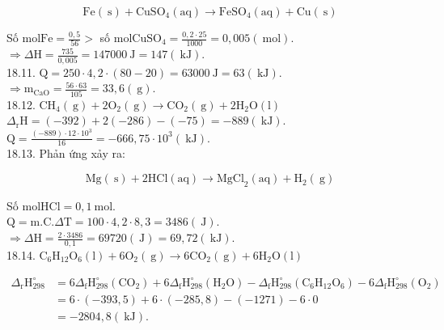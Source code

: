\documentclass[10pt]{article}
\begin{document}
$$
\mathrm{Fe}(\mathrm{~s})+\mathrm{CuSO}_{4}(\mathrm{aq}) \rightarrow \mathrm{FeSO}_{4}(\mathrm{aq})+\mathrm{Cu}(\mathrm{~s})
$$

Số $\mathrm{mol} \mathrm{Fe}=\frac{0,5}{56}>$ số $\mathrm{mol} \mathrm{CuSO}_{4}=\frac{0,2 \cdot 25}{1000}=0,005(\mathrm{~mol})$.\\
$\Rightarrow \Delta \mathrm{H}=\frac{735}{0,005}=147000 \mathrm{~J}=147(\mathrm{~kJ})$.\\
18.11. $\mathrm{Q}=250 \cdot 4,2 \cdot(80-20)=63000 \mathrm{~J}=63(\mathrm{~kJ})$.\\
$\Rightarrow \mathrm{m}_{\mathrm{CaO}}=\frac{56 \cdot 63}{105}=33,6(\mathrm{~g})$.\\
18.12. $\mathrm{CH}_{4}(\mathrm{~g})+2 \mathrm{O}_{2}(\mathrm{~g}) \rightarrow \mathrm{CO}_{2}(\mathrm{~g})+2 \mathrm{H}_{2} \mathrm{O}(\mathrm{l})$\\
$\Delta_{\mathrm{r}} \mathrm{H}=(-392)+2(-286)-(-75)=-889(\mathrm{~kJ})$.\\
$\mathrm{Q}=\frac{(-889) \cdot 12 \cdot 10^{3}}{16}=-666,75 \cdot 10^{3}(\mathrm{~kJ})$.\\
18.13. Phản ứng xảy ra:

$$
\mathrm{Mg}(\mathrm{~s})+2 \mathrm{HCl}(\mathrm{aq}) \rightarrow \mathrm{MgCl}_{2}(\mathrm{aq})+\mathrm{H}_{2}(\mathrm{~g})
$$

Số $\mathrm{mol} \mathrm{HCl}=0,1 \mathrm{~mol}$.\\
$\mathrm{Q}=\mathrm{m} . \mathrm{C} . \Delta \mathrm{T}=100 \cdot 4,2 \cdot 8,3=3486(\mathrm{~J})$.\\
$\Rightarrow \Delta \mathrm{H}=\frac{2 \cdot 3486}{0,1}=69720(\mathrm{~J})=69,72(\mathrm{~kJ})$.\\
18.14. $\mathrm{C}_{6} \mathrm{H}_{12} \mathrm{O}_{6}(\mathrm{l})+6 \mathrm{O}_{2}(\mathrm{~g}) \rightarrow 6 \mathrm{CO}_{2}(\mathrm{~g})+6 \mathrm{H}_{2} \mathrm{O}(\mathrm{l})$

$$
\begin{aligned}
\Delta_{\mathrm{r}} \mathrm{H}_{298}^{\circ} & =6 \Delta_{\mathrm{f}} \mathrm{H}_{298}^{\circ}\left(\mathrm{CO}_{2}\right)+6 \Delta_{\mathrm{f}} \mathrm{H}_{298}^{\circ}\left(\mathrm{H}_{2} \mathrm{O}\right)-\Delta_{\mathrm{f}} \mathrm{H}_{298}^{\circ}\left(\mathrm{C}_{6} \mathrm{H}_{12} \mathrm{O}_{6}\right)-6 \Delta_{\mathrm{f}} \mathrm{H}_{298}^{\circ}\left(\mathrm{O}_{2}\right) \\
& =6 \cdot(-393,5)+6 \cdot(-285,8)-(-1271)-6 \cdot 0 \\
& =-2804,8(\mathrm{~kJ}) .
\end{aligned}
$$
\end{document}
